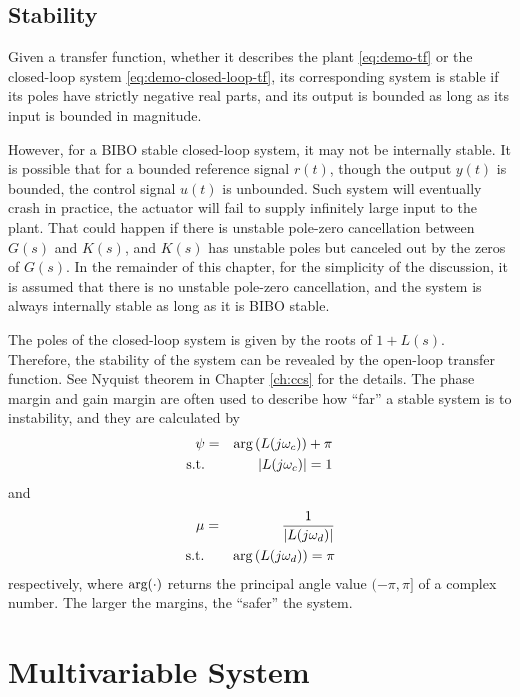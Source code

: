 \subsection{Stability}

Given a transfer function, whether it describes the plant \eqref{eq:demo-tf} or the closed-loop system \eqref{eq:demo-closed-loop-tf}, its corresponding system is  stable if its poles have strictly negative real parts, and its output is bounded as long as its input is bounded in magnitude.

However, for a BIBO stable closed-loop system, it may not be internally stable. It is possible that for a bounded reference signal $r(t)$, though the output $y(t)$ is bounded, the control signal $u(t)$ is unbounded. Such system will eventually crash in practice, the actuator will fail to supply infinitely large input to the plant. That could happen if there is unstable pole-zero cancellation between $G(s)$ and $K(s)$, and $K(s)$ has unstable poles but canceled out by the zeros of $G(s)$. In the remainder of this chapter, for the simplicity of the discussion, it is assumed that there is no unstable pole-zero cancellation, and the system is always internally stable as long as it is BIBO stable.

The poles of the closed-loop system is given by the roots of $1+L(s)$. Therefore, the stability of the system can be revealed by the open-loop transfer function. See Nyquist theorem in Chapter \ref{ch:ccs} for the details. The phase margin and gain margin are often used to describe how ``far'' a stable system is to instability, and they are calculated by
\begin{eqnarray}
	\psi &=& \textup{arg}\left(L(j\omega_c)\right) + \pi \nonumber \\
	\textup{s.t.} && |L(j\omega_c)| = 1 \nonumber
\end{eqnarray}
and
\begin{eqnarray}
	\mu &=& \dfrac{1}{|L(j\omega_d)|} \nonumber \\
	\textup{s.t.} && \textup{arg}\left(L(j\omega_d)\right) = \pi \nonumber
\end{eqnarray}
respectively, where $\textup{arg}(\cdot)$ returns the principal angle value $(-\pi, \pi]$ of a complex number. The larger the margins, the ``safer'' the system.

\section{Multivariable System}

